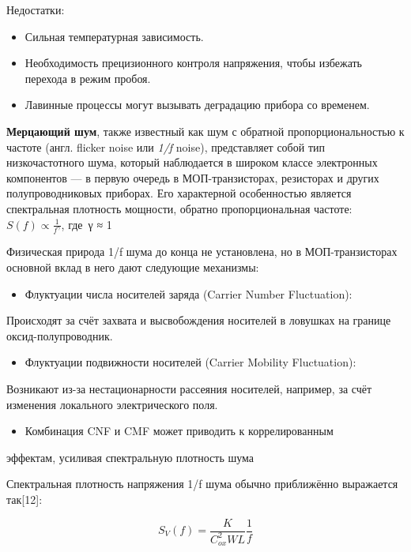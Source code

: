 Недостатки:

\begin{itemize}
\item
  Сильная температурная зависимость.
\item
  Необходимость прецизионного контроля напряжения, чтобы избежать
  перехода в режим пробоя.
\item
  Лавинные процессы могут вызывать деградацию прибора со временем.
\end{itemize}

\textbf{Мерцающий шум}, также известный как шум с обратной
пропорциональностью к частоте (англ. flicker noise или \emph{1/f}
noise), представляет собой тип низкочастотного шума, который наблюдается
в широком классе электронных компонентов --- в первую очередь в
МОП-транзисторах, резисторах и других полупроводниковых приборах. Его
характерной особенностью является спектральная плотность мощности,
обратно пропорциональная частоте: \(S(f) \propto \frac{1}{f^{\gamma}}\),
где~γ ≈ 1

Физическая природа 1/f шума до конца не установлена, но в
МОП-транзисторах основной вклад в него дают следующие механизмы:

\begin{itemize}
\item
  Флуктуации числа носителей заряда (Carrier Number Fluctuation):
\end{itemize}

Происходят за счёт захвата и высвобождения носителей в ловушках на
границе оксид-полупроводник.

\begin{itemize}
\item
  Флуктуации подвижности носителей (Carrier Mobility Fluctuation):
\end{itemize}

Возникают из-за нестационарности рассеяния носителей, например, за счёт
изменения локального электрического поля.

\begin{itemize}
\item
  Комбинация CNF и CMF может приводить к коррелированным
\end{itemize}

эффектам, усиливая спектральную плотность шума

Спектральная плотность напряжения 1/f шума обычно приближённо выражается
так{[}12{]}:

\[S_{V}(f) = \frac{K}{C_{ox}^{2}WL}\frac{1}{f}\]

